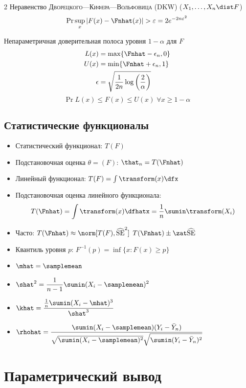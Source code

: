 \documentclass[landscape]{article}
\def\sehat{\ensuremath{\widehat{\mathrm{SE}}}}
\begin{document}
\begin{multicols*}{2}
Неравенство \textsc{Дворецкого—Кифера—Вольфовица} (DKW) ($X_1,\dots,X_n\dist F$)
\[\Pr{\sup_x\left|F(x)-\Fnhat(x)\right| > \varepsilon} =
  2e^{-2n\varepsilon^2}\]

Непараметричная доверительная полоса уровня $1-\alpha$ для $F$
\begin{align*}
  L(x) &= \max\{\Fnhat-\epsilon_n, 0\} \\
  U(x) &= \min\{\Fnhat+\epsilon_n, 1\} \\
  \epsilon &=
    \sqrt{\displaystyle\frac{1}{2n}\log\left( \frac{2}{\alpha} \right)} \\
\end{align*}
\[\Pr{L(x) \le F(x) \le U(x) \;\forall x} \ge 1-\alpha\]

\subsection{Статистические функционалы}

\begin{itemize}
  \item Статистический функционал: $T(F)$
  \item Подстановочная оценка $\theta = (F)$: $\that_n = T(\Fnhat)$
  \item Линейный функционал: $T(F) = \int \transform(x)\dfx$
  \item Подстановочная оценка линейного функционала: \\
    \[T(\Fnhat)
      = \displaystyle\int \transform(x)\dfhatx
      = \frac{1}{n}\sumin \transform(X_i)\]
  \item Часто: $T(\Fnhat) \approx \norm[T(F),\sehat^2]$ \imp
    $T(\Fnhat) \pm \zat\sehat$
  \item Квантиль уровня $p$: $F^{-1}(p) = \inf\{x:F(x) \ge p\}$
  \item $\mhat = \samplemean$
  \item $\shat^2 = \displaystyle\frac{1}{n-1}\sumin
    (X_i-\samplemean)^2$
  \item  $\khat =
    \displaystyle\frac{\frac{1}{n}\sumin(X_i-\mhat)^3}{\shat^3}$
  \item $\rhohat = \displaystyle\frac{\sumin(X_i-\samplemean)(Y_i-\bar{Y}_n)}%
    {\sqrt{\sumin(X_i-\samplemean)^2}\sqrt{\sumin(Y_i-\bar{Y}_n)^2}}$
\end{itemize}

\section{Параметрический вывод}


\end{multicols*}
\end{document}
